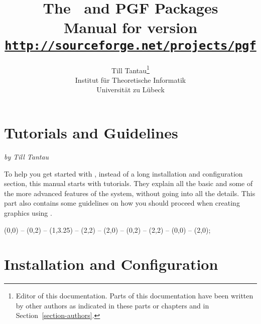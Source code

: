 \title{\bfseries The \tikzname\ and {\Large PGF} Packages\\
  \large Manual for version \pgfversion\\[1mm]
\large\href{http://sourceforge.net/projects/pgf}{\texttt{http://sourceforge.net/projects/pgf}}}
\author{Till Tantau\footnote{Editor of this documentation. Parts of
    this documentation have been written by other authors as indicated
    in these parts or chapters and in Section~\ref{section-authors}.}\\
  \normalsize Institut f\"ur Theoretische Informatik\\[-1mm]
  \normalsize Universit\"at zu L\"ubeck}

\maketitle

\tableofcontents

\clearpage





\part{Tutorials and Guidelines}

{\Large \emph{by Till Tantau}}

\bigskip
\noindent
To help you get started with \tikzname, instead of a long installation
and configuration section, this manual starts with tutorials. They
explain all the basic and some of the more advanced features of the
system, without going into all the details. This part also contains
some guidelines on how you should proceed when creating graphics using
\tikzname.

\vskip3cm

\begin{codeexample}[graphic=white,width=0pt]
\tikz \draw[thick,rounded corners=8pt]
  (0,0) -- (0,2) -- (1,3.25) -- (2,2) -- (2,0) -- (0,2) -- (2,2) -- (0,0) -- (2,0);
\end{codeexample}










\part{Installation and Configuration}

